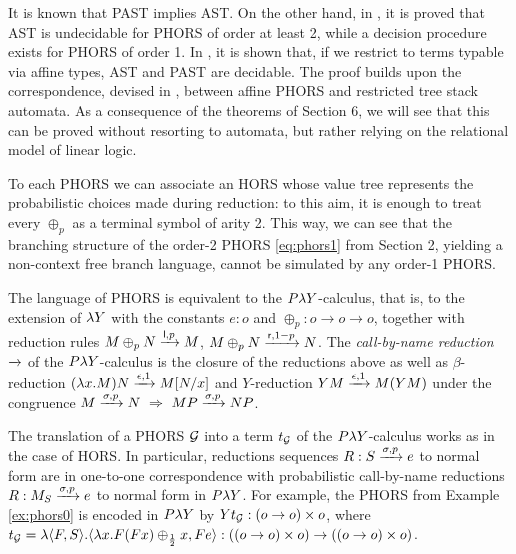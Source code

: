 It is known that PAST implies AST. On the other hand, in \cite{DBLP:journals/lmcs/KobayashiLG20}, it is proved that AST is undecidable for PHORS of order at least 2, while a decision procedure exists for PHORS of order 1. In \cite{DBLP:conf/lics/LiMO22}, it is shown that, if we restrict to terms typable via affine types, AST and PAST are decidable. The proof builds upon the correspondence, devised in \cite{DBLP:conf/mfcs/ClairambaultM19}, between affine PHORS and restricted tree stack automata. As a consequence of the theorems of Section 6, we will see that this can be proved without resorting to automata, but rather relying on the relational model of linear logic.



\begin{remark}
	To each PHORS we can associate an HORS whose value tree represents the probabilistic choices made during reduction: to this aim, it is enough to treat every $\oplus_p$ as a terminal symbol of arity 2. This way, we can see that the branching structure of the order-2 PHORS \eqref{eq:phors1} from Section 2, yielding a non-context free branch language, 
	cannot be simulated by any order-1 PHORS.
\end{remark}


The language of PHORS is equivalent to the $P\lambda Y$-calculus, that is, to the extension of $\lambda Y$ with the constants $ e:o$ and $\oplus_p : o\to o\to o$, together with 
reduction rules
$M\oplus_p N  \xrightarrow{\mathsf l,p} M$,
$M\oplus_p N \xrightarrow{\mathsf r,1-p} N$.
The \emph{call-by-name reduction $\xrightarrow{}$} of the $P\lambda Y$-calculus is the closure of the reductions above as well as 
 $\beta$-reduction $(\lambda x.M)N\xrightarrow{\epsilon,1} M[N/x]$ and $Y$-reduction $YM\xrightarrow{\epsilon,1}M(YM)$ under the congruence
 $M\redbigp{\sigma, p} N \ \Rightarrow \ MP \redbigp{\sigma, p} NP$.
  
 
The translation of a PHORS $\mathcal{G}$ into a term $t_{\mathcal{G}}$ of the $P\lambda Y$-calculus works as in the case of HORS. In particular, reductions sequences $R:S\xrightarrow{\sigma, p}e$ to normal form are in one-to-one correspondence with probabilistic call-by-name reductions $R:M_S\xrightarrow{\sigma, p}e$ to normal form in $P\lambda Y$.
For example, the PHORS from Example \ref{ex:phors0} is encoded in $P\lambda Y$ by $Yt_{\mathcal{G}}:(o\to o)\times o$, where $t_{\mathcal{G}}= \lambda\langle F,S\rangle. \langle \lambda  x.F(Fx)\oplus_{\frac{1}{2}} x, Fe\rangle:((o\to o)\times o)\to ((o\to o)\times o)$.




